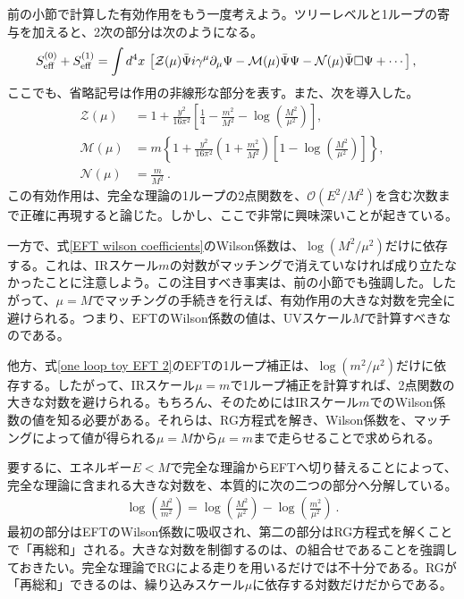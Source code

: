 前の小節で計算した有効作用をもう一度考えよう。ツリーレベルと1ループの寄与を加えると、2次の部分は次のようになる。
%
\begin{align}
	S^{(0)}_{\rm eff} + S^{(1)}_{\rm eff} & = \int d^4 x \,\left[ \mathcal{Z}(\mu) \bar \Psi i \gamma^\mu \partial_\mu \Psi -  \mathcal{M}(\mu) \bar \Psi \Psi - \mathcal{N}(\mu) \bar \Psi \square \Psi + \cdots \right] ,
\end{align}
%
ここでも、省略記号は作用の非線形な部分を表す。また、次を導入した。
%
\begin{subequations} \label{EFT wilson coefficients}
\begin{align}
	\mathcal{Z}(\mu) &= 1 + \frac{y^2}{16 \pi^2} \left[ \frac{1}{4}-\frac{m^2}{M^2} - \log \left( \frac{M^2}{\mu^2} \right) \right] , \label{Z 1-loop toy} \\
	\mathcal{M}(\mu) &= m \left\{ 1 + \frac{y^2}{16 \pi^2}\left(1+\frac{m^2}{M^2} \right) \left[ 1 - \log \left(\frac{M^2}{\mu^2} \right) \right] \right\} , \label{M 1-loop toy} \\
	\mathcal{N}(\mu) &= \frac{m}{M^2} \ . \label{N 1-loop toy}
\end{align}
\end{subequations}
%
この有効作用は、完全な理論の1ループの2点関数を、$\mathcal{O}(E^2/M^2)$を含む次数まで正確に再現すると論じた。しかし、ここで非常に興味深いことが起きている。

一方で、式\eqref{EFT wilson coefficients}のWilson係数は、$\log (M^2 / \mu^2)$だけに依存する。これは、IRスケール$m$の対数がマッチングで消えていなければ成り立たなかったことに注意しよう。この注目すべき事実は、前の小節でも強調した。したがって、$\mu = M$でマッチングの手続きを行えば、有効作用の大きな対数を完全に避けられる。つまり、EFTのWilson係数の値は、UVスケール$M$で計算すべきなのである。

他方、式\eqref{one loop toy EFT 2}のEFTの1ループ補正は、$\log (m^2 / \mu^2)$だけに依存する。したがって、IRスケール$\mu = m$で1ループ補正を計算すれば、2点関数の大きな対数を避けられる。もちろん、そのためにはIRスケール$m$でのWilson係数の値を知る必要がある。それらは、RG方程式を解き、Wilson係数を、マッチングによって値が得られる$\mu = M$から$\mu = m$まで走らせることで求められる。

要するに、エネルギー$E < M$で完全な理論からEFTへ切り替えることによって、完全な理論に含まれる大きな対数を、本質的に次の二つの部分へ分解している。
%
\begin{align}
	\log \left( \frac{M^2}{m^2} \right) = \log \left( \frac{M^2}{\mu^2} \right) - \log \left( \frac{m^2}{\mu^2} \right) \ . 
\end{align}
%
最初の部分はEFTのWilson係数に吸収され、第二の部分はRG方程式を解くことで「再総和」される。大きな対数を制御するのは、の組合せであることを強調しておきたい。完全な理論でRGによる走りを用いるだけでは不十分である。RGが「再総和」できるのは、繰り込みスケール$\mu$に依存する対数だけだからである。




